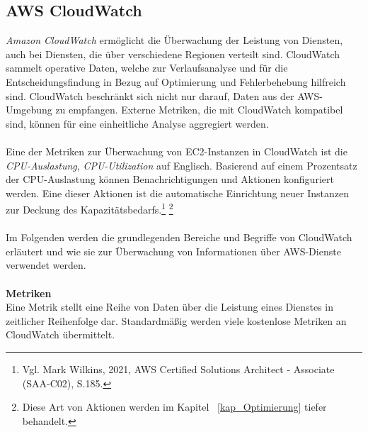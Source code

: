 \subsection{AWS CloudWatch}\label{ssec:CloudWatch}
\textit{Amazon CloudWatch} ermöglicht die Überwachung der Leistung von Diensten, auch bei Diensten, die über verschiedene Regionen verteilt sind. CloudWatch sammelt operative Daten, welche zur Verlaufsanalyse und für die Entscheidungsfindung in Bezug auf Optimierung und Fehlerbehebung hilfreich sind. CloudWatch beschränkt sich nicht nur darauf, Daten aus der AWS-Umgebung zu empfangen. Externe Metriken, die mit CloudWatch kompatibel sind, können für eine einheitliche Analyse aggregiert werden. 
\\\\
Eine der Metriken zur Überwachung von EC2-Instanzen in CloudWatch ist die \textit{CPU-Auslastung}, \textit{CPU-Utilization} auf Englisch. Basierend auf einem Prozentsatz der CPU-Auslastung können Benachrichtigungen und Aktionen konfiguriert werden. Eine dieser Aktionen ist die automatische Einrichtung neuer Instanzen zur Deckung des Kapazitätsbedarfs.\footnote{Vgl. Mark Wilkins, 2021, AWS Certified Solutions Architect - Associate (SAA-C02), S.185.\cite{AWS1}} \footnote{Diese Art von Aktionen werden im Kapitel ~\ref{kap_Optimierung} tiefer behandelt.}
\\\\
Im Folgenden werden die grundlegenden Bereiche und Begriffe von CloudWatch erläutert und wie sie zur Überwachung von Informationen über AWS-Dienste verwendet werden.
\\\\
\textbf{Metriken} \\
Eine Metrik stellt eine Reihe von Daten über die Leistung eines Dienstes in zeitlicher Reihenfolge dar. Standardmäßig werden viele kostenlose Metriken an CloudWatch übermittelt.

